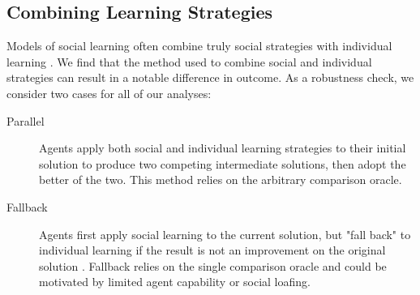 \documentclass[twocolumn,10pt]{article}
\begin{document}
\fi

\subsection{Combining Learning Strategies}\label{subsubsec:combine}
Models of social learning often combine truly social strategies with individual learning \cite{lazer_network_2007, barkoczi_social_2016,gomez_clustering_2019}.
We find that the method used to combine social and individual strategies can result in a notable difference in outcome. As a robustness check, we consider two cases for all of our analyses:
\begin{description}

\item[Parallel]{
Agents apply both social and individual learning strategies to their initial solution to produce two competing intermediate solutions, then adopt the better of the two. This method relies on the arbitrary comparison oracle.}
\item[Fallback]{
Agents first apply social learning to the current solution, but "fall back" to individual learning if the result is not an improvement on the original solution \cite{lazer_network_2007, barkoczi_social_2016,gomez_clustering_2019}. Fallback relies on the single comparison oracle and could be motivated by limited agent capability or social loafing.}
\end{description}

\end{document}
